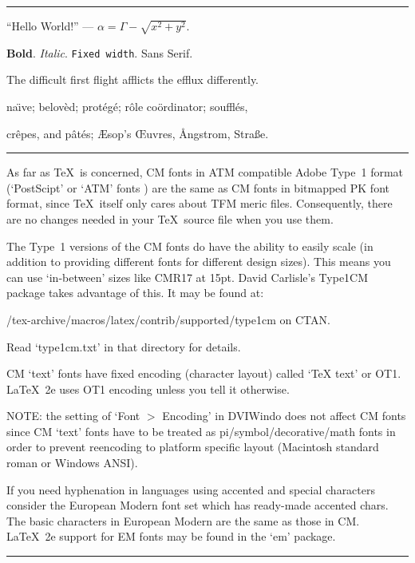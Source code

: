 \documentclass{article}
\begin{document}
\hrule \vskip 2mm

``Hello World!'' --- $\alpha = \Gamma -\sqrt{x^2+y^2}$.

\vskip 2mm

{\bf Bold}. {\it Italic}. {\tt Fixed width}. {\sf Sans Serif}.



\vskip 2mm

The difficult first flight afflicts the efflux differently.

\vskip 2mm

na\"\i ve; belov\`ed; prot\'eg\'e; r\^ole co\"ordinator; souffl\'es, 

\vskip 2mm

cr\^epes, and p\^at\'es; \AE sop's \OE uvres, \AA ngstrom, Stra\ss e.

\vskip 2mm \hrule \vskip 2mm

\noindent
As far as \TeX\ is concerned, CM fonts in ATM compatible Adobe Type~1 format
(`PostScipt' or `ATM' fonts ) are the same as CM fonts in bitmapped PK font
format, since \TeX\ itself only cares about TFM meric files.  Consequently,
there are no changes needed in your \TeX\ source file when you use them.

The Type~1 versions of the CM fonts do have the ability to easily scale
(in addition to providing different fonts for different design sizes).
This means you can use `in-between' sizes like CMR17 at 15pt.  David
Carlisle's Type1CM package takes advantage of this. It may be found at:

\vskip 2mm

{\sf /tex-archive/macros/latex/contrib/supported/type1cm} on CTAN.

\vskip 2mm

\noindent Read `type1cm.txt' in that directory for details.

CM `text' fonts have fixed encoding (character layout) called 
`TeX text' or OT1.  \LaTeX\ 2e uses OT1 encoding unless you tell it otherwise.

NOTE: the setting of `Font $>$ Encoding' in DVIWindo does not affect CM fonts 
since CM `text' fonts have to be treated as pi/symbol/decorative/math fonts
in order to prevent reencoding to platform specific layout (Macintosh
standard roman or Windows ANSI).

If you need hyphenation in languages using accented and special characters
consider the European Modern font set which has ready-made accented chars.
The basic characters in European Modern are the same as those in CM.
\LaTeX\ 2e support for EM fonts may be found in the `em' package.

\vskip 2mm \hrule
\end{document}
